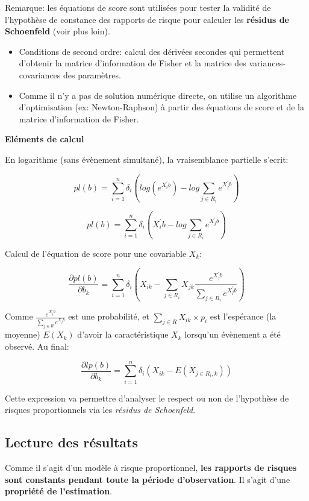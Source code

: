 \documentclass[
  12pt,
  letterpaper,
  DIV=11,
  numbers=noendperiod,
  onepage,
  openany]{scrreprt}
\begin{document}
Remarque: les équations de score sont utilisées pour tester la validité
de l'hypothèse de constance des rapports de risque pour calculer les
\textbf{résidus de Schoenfeld} (voir plus loin).

\begin{itemize}
\item
  Conditions de second ordre: calcul des dérivées secondes qui
  permettent d'obtenir la matrice d'information de Fisher et la matrice
  des variances-covariances des paramètres.
\item
  Comme il n'y a pas de solution numérique directe, on utilise un
  algorithme d'optimisation (ex: Newton-Raphson) à partir des équations
  de score et de la matrice d'information de Fisher.
\end{itemize}

\textbf{Eléments de calcul}

En logarithme (sans évènement simultané), la vraisemblance partielle
s'ecrit:

\[pl(b)=\sum_{i=1}^n\delta_i\left(log(e^{X_{i}^{'}b})-log\sum_{j\in R_i}e^{X_{j}^{'}b}\right)\]

\[pl(b)=\sum_{i=1}^n\delta_i\left(X_{i}^{'}b-log\sum_{j\in R_i}e^{X_{j}^{'}b}\right)\]

Calcul de l'équation de score pour une covariable \(X_k\):

\[\frac{\partial pl(b)}{\partial{b_k}}=\sum_{i=1}^n\delta_i\left(X_{ik}-\sum_{j\in R_i}X_{jk}\frac{e^{X_{j}^{'}b}}{\sum_{j\in R_i}e^{X_{j}^{'}b}}\right)\]

Comme \(\frac{e^{X_{j}b}}{\sum_{j\in R}e^{X_{j}b}}\) est une
probabilité, et \(\sum_{j\in R}X_{ik}\times p_i\) est l'espérance (la
moyenne) \(E(X_k)\) d'avoir la caractéristique \(X_k\) lorsqu'un
évènement a été observé. Au final:

\[\frac{\partial lp(b)}{\partial{b_k}}= \sum_{i=1}^n\delta_i\left(X_{ik} - E(X_{j\in R_i,k}) \right)\]

Cette expression va permettre d'analyser le respect ou non de
l'hypothèse de risques proportionnels via les \emph{résidus de
Schoenfeld}.

\hypertarget{lecture-des-ruxe9sultats}{%
\subsection{Lecture des résultats}\label{lecture-des-ruxe9sultats}}

Comme il s'agit d'un modèle à risque proportionnel, \textbf{les rapports
de risques sont constants pendant toute la période d'observation}. Il
s'agit d'une \textbf{propriété de l'estimation}.
\end{document}
